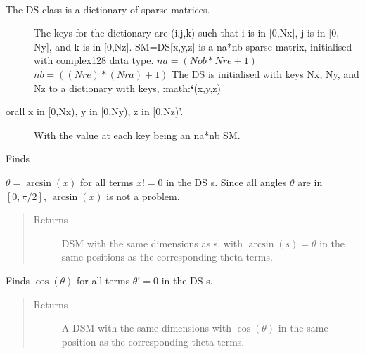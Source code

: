 \documentclass[letterpaper,10pt,english]{sphinxmanual}
\begin{document}
\begin{fulllineitems}
\label{index:DictionarySparseMatrix.DS}~\begin{description}
\item[{The DS class is a dictionary of sparse matrices.}] \leavevmode
The keys for the dictionary are (i,j,k) such that i is in {[}0,Nx{]},
j is in {[}0, Ny{]}, and k is in {[}0,Nz{]}.
SM=DS{[}x,y,z{]} is a na*nb sparse matrix, initialised with complex128 data type.
\(na=(Nob*Nre+1)\)
\(nb=((Nre)*(Nra)+1)\)
The DS is initialised with keys Nx, Ny, and Nz to a dictionary with   keys, :math:{\color{red}\bfseries{}{}`}(x,y,z)

\item[{orall x in {[}0,Nx), y in {[}0,Ny), z in {[}0,Nz)'.}] \leavevmode
With the value at each key being an na*nb SM.

\end{description}

\begin{fulllineitems}
\label{index:DictionarySparseMatrix.DS.asin}
Finds

\(\theta=\arcsin(x)\) for all terms \(x != 0\) in     the DS s. Since all angles     \(\theta\) are in \([0,\pi /2]\),     \(\arcsin(x)\) is not a problem.
\begin{quote}\begin{description}
\item[{Returns}] \leavevmode
DSM with the same dimensions as s, with     \(\arcsin(s)=\theta\) in      the same positions as the corresponding theta terms.

\end{description}\end{quote}

\end{fulllineitems}


\begin{fulllineitems}
\label{index:DictionarySparseMatrix.DS.cos}
Finds \(\cos(\theta)\) for all terms     \(\theta != 0\) in the DS s.
\begin{quote}\begin{description}
\item[{Returns}] \leavevmode
A DSM with the same dimensions with     \(\cos(\theta)\) in the      same position as the corresponding theta terms.


\end{description}
\end{quote}
\end{fulllineitems}
\end{fulllineitems}
\end{document}
